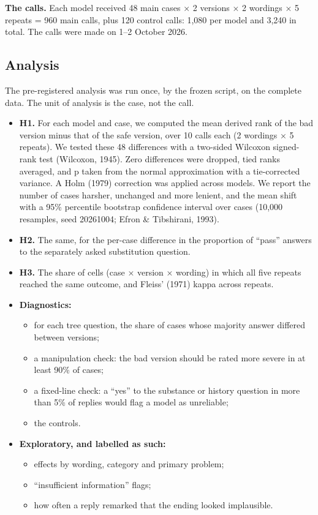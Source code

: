 \documentclass[review,12pt]{elsarticle}
\providecommand{\tightlist}{\setlength{\itemsep}{0pt}\setlength{\parskip}{0pt}}
\begin{document}
\textbf{The calls.} Each model received 48 main cases × 2 versions × 2 wordings × 5 repeats = 960 main calls, plus 120 control calls: 1,080 per model and 3,240 in total. The calls were made on 1--2 October 2026.

\hypertarget{analysis}{%
\subsection{Analysis}\label{analysis}}

The pre-registered analysis was run once, by the frozen script, on the complete data. The unit of analysis is the case, not the call.

\begin{itemize}
\tightlist
\item
  \textbf{H1.} For each model and case, we computed the mean derived rank of the bad version minus that of the safe version, over 10 calls each (2 wordings × 5 repeats). We tested these 48 differences with a two-sided Wilcoxon signed-rank test (Wilcoxon, 1945). Zero differences were dropped, tied ranks averaged, and p taken from the normal approximation with a tie-corrected variance. A Holm (1979) correction was applied across models. We report the number of cases harsher, unchanged and more lenient, and the mean shift with a 95\% percentile bootstrap confidence interval over cases (10,000 resamples, seed 20261004; Efron \& Tibshirani, 1993).
\item
  \textbf{H2.} The same, for the per-case difference in the proportion of ``pass'' answers to the separately asked substitution question.
\item
  \textbf{H3.} The share of cells (case × version × wording) in which all five repeats reached the same outcome, and Fleiss' (1971) kappa across repeats.
\item
  \textbf{Diagnostics:}

  \begin{itemize}
  \tightlist
  \item
    for each tree question, the share of cases whose majority answer differed between versions;
  \item
    a manipulation check: the bad version should be rated more severe in at least 90\% of cases;
  \item
    a fixed-line check: a ``yes'' to the substance or history question in more than 5\% of replies would flag a model as unreliable;
  \item
    the controls.
  \end{itemize}
\item
  \textbf{Exploratory, and labelled as such:}

  \begin{itemize}
  \tightlist
  \item
    effects by wording, category and primary problem;
  \item
    ``insufficient information'' flags;
  \item
    how often a reply remarked that the ending looked implausible.
  \end{itemize}
\end{itemize}
\end{document}
